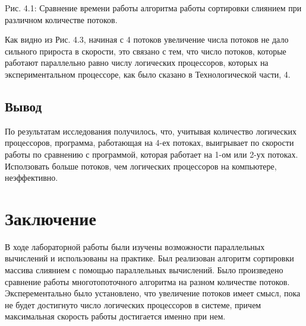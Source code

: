 \documentclass[12pt]{report}
\begin{document}
 \begin{center}

 	Pис. 4.1: Сравнение времени работы алгоритма работы сортировки слиянием при различном количестве потоков.
 \end{center}
 
Как видно из Рис. 4.3, начиная с 4 потоков увеличение числа потоков не дало сильного прироста в скорости, это связано с тем, что число потоков, которые  работают параллельно равно числу логических процессоров, которых на экспериментальном процессоре, как было сказано в Технологической части, 4.
 
 
 \section*{Вывод}
 \qquad По результатам исследования получилось, что, учитывая количество логических процессоров, программа, работающая на 4-ех потоках, выигрывает по скорости работы по сравнению с программой, которая работает на 1-ом или 2-ух потоках. Исползовать больше потоков, чем логических процессоров на компьютере, неэффективно.
 
\newpage
\chapter*{Заключение}
\hspace{0.6cm}В ходе лабораторной работы были изучены возможности параллельных вычислений и использованы на практике. Был реализован алгоритм сортировки массива слиянием с помощью параллельных вычислений.
Было произведено сравнение работы многотопоточного алгоритма на разном количестве потоков. Эксперементально было установлено, что увеличение потоков имеет смысл, пока не будет достигнуто число логических процессоров в системе, причем максимальная скорость работы достигается именно при нем.
 
\end{document}
